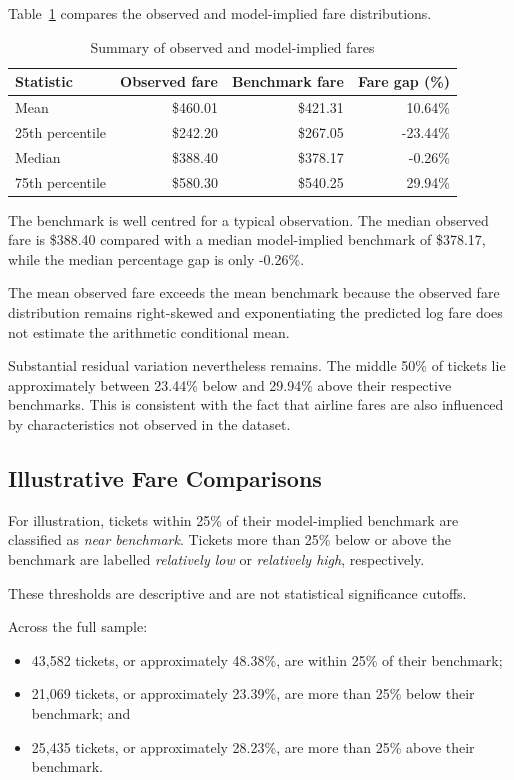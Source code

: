 \documentclass[11pt,a4paper]{article}
\begin{document}
Table~\ref{tab:benchmark-summary} compares the observed and model-implied fare distributions.

\begin{table}[H]
\centering
\caption{Summary of observed and model-implied fares}
\label{tab:benchmark-summary}
\begin{tabular}{lrrr}
\toprule
\textbf{Statistic} & \textbf{Observed fare} & \textbf{Benchmark fare} & \textbf{Fare gap (\%)} \\
\midrule
Mean & \$460.01 & \$421.31 & 10.64\% \\
25th percentile & \$242.20 & \$267.05 & -23.44\% \\
Median & \$388.40 & \$378.17 & -0.26\% \\
75th percentile & \$580.30 & \$540.25 & 29.94\% \\
\bottomrule
\end{tabular}
\end{table}

The benchmark is well centred for a typical observation. The median observed fare is \$388.40 compared with a median model-implied benchmark of \$378.17, while the median percentage gap is only -0.26\%.

The mean observed fare exceeds the mean benchmark because the observed fare distribution remains right-skewed and exponentiating the predicted log fare does not estimate the arithmetic conditional mean.

Substantial residual variation nevertheless remains. The middle 50\% of tickets lie approximately between 23.44\% below and 29.94\% above their respective benchmarks. This is consistent with the fact that airline fares are also influenced by characteristics not observed in the dataset.

\subsection{Illustrative Fare Comparisons}

For illustration, tickets within 25\% of their model-implied benchmark are classified as \textit{near benchmark}. Tickets more than 25\% below or above the benchmark are labelled \textit{relatively low} or \textit{relatively high}, respectively.

These thresholds are descriptive and are not statistical significance cutoffs.

Across the full sample:

\begin{itemize}
    \item 43,582 tickets, or approximately 48.38\%, are within 25\% of their benchmark;
    \item 21,069 tickets, or approximately 23.39\%, are more than 25\% below their benchmark; and
    \item 25,435 tickets, or approximately 28.23\%, are more than 25\% above their benchmark.
\end{itemize}
\end{document}
